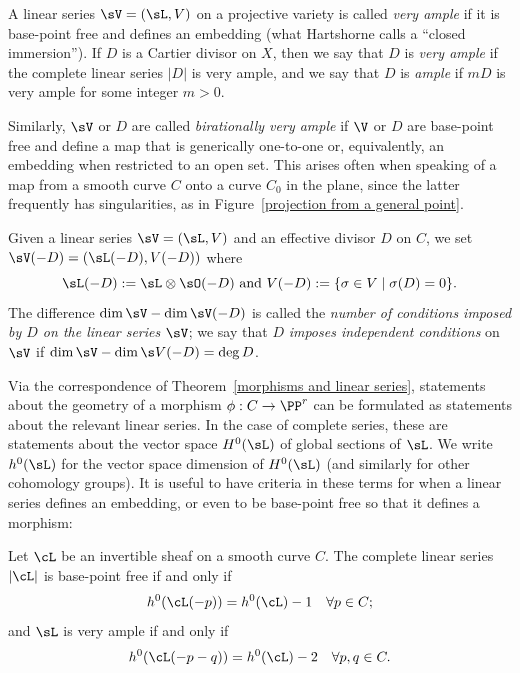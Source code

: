 A linear series $\sV = (\sL, V)$ on a projective variety is called  
\emph{very ample}
%
if it is base-point free and defines an embedding (what Hartshorne
calls a ``closed immersion''). If $D$ is a Cartier divisor on $X$,
then we say that $D$ is \emph{very ample} if the complete linear
series $|D|$ is very ample, and we say that $D$ is 
\emph{ample}
% 
if
$mD$ is very ample for some integer $m>0$.  

Similarly, $\sV$ or $D$ are called 
\emph{birationally very ample}
%
if $\V$ or $D$ are base-point free and define a map that is generically one-to-one or, equivalently,
an embedding when restricted to an open set. This arises often when speaking of a map from a smooth
curve $C$ onto a curve $C_{0}$ in the plane, since the latter frequently has singularities, as in Figure~\ref{projection from a general point}.

Given a linear series $\sV = (\sL, V)$ and an effective divisor $D$ on $C$, we  set
$
\sV(-D) = (\sL(-D),V(-D))
$
where
$$
\sL(-D): = \sL \otimes \sO(-D)\hbox{ and } V(-D) := \{ \sigma \in V \mid \sigma(D) = 0 \}.
$$
The difference $\dim \sV - \dim \sV(-D)$ is called the \emph{number of conditions imposed by $D$ on the linear series $\sV$}; we say that $D$ \emph{imposes independent conditions} on $\sV$ if $\dim \sV - \dim \s V(-D) = \deg D$.

Via the correspondence of Theorem~\ref{morphisms and linear series}, statements about the geometry of a morphism $\phi : C \to \PP^r$ can be formulated as statements about the relevant linear series. In the case of complete series, these are statements about the vector space $H^{0}(\sL)$ of global sections of $\sL$. We write $h^{0}(\sL)$ for the vector space dimension of $H^0(\sL)$ (and similarly for other cohomology groups). It is useful to have criteria
in these terms for when a linear series defines an embedding, or even to be base-point free so that it
defines a morphism:

\begin{proposition}\label{very ample}
{\rm\cite[Theorem IV.3.1]{Hartshorne1977}}
Let $\cL$ be an invertible sheaf on a smooth curve $C$. The complete linear series $|\cL|$ is base-point free if and only if
$$
h^0(\cL(-p)) = h^0(\cL) - 1 \quad \forall p \in C;
$$
and $\sL$ is very ample if and only if
$$
h^0(\cL(-p-q)) = h^0(\cL) - 2 \quad \forall p, q \in C.
\vspace*{-\parskip}
$$
\end{proposition} 

